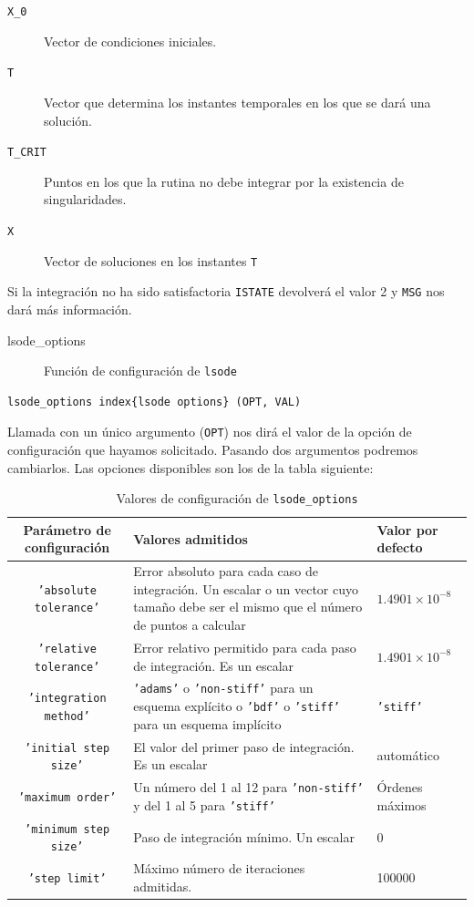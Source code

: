 \begin{description}
\item [\texttt{X\_0}]Vector de condiciones iniciales.
\item [\texttt{T}]Vector que determina los instantes temporales en los
  que se dará una solución.
\item [\texttt{T\_CRIT}]Puntos en los que la rutina no debe integrar
  por la existencia de singularidades.
\item [\texttt{X}]Vector de soluciones en los instantes \texttt{T}
\end{description}
Si la integración no ha sido satisfactoria \texttt{ISTATE} devolverá
el valor 2 y \texttt{MSG} nos dará más información.

\begin{description}
\item [lsode\_options]Función de configuración de \texttt{lsode}
\end{description}
\begin{verbatim}
lsode_options index{lsode options} (OPT, VAL)
\end{verbatim}
Llamada con un único argumento (\texttt{OPT}) nos dirá el valor de la
opción de configuración que hayamos solicitado. Pasando dos argumentos
podremos cambiarlos. Las opciones disponibles son los de la tabla
siguiente:

%
\begin{table}[H]
  \centering{}\begin{tabular}{|c|m{8cm}|p{3cm}|}
    \hline 
    Parámetro de configuración&
    Valores admitidos&
    Valor por defecto\tabularnewline
    \hline
    \hline 
    \texttt{'absolute tolerance'}&
    Error absoluto para cada caso de integración. Un escalar o un vector
    cuyo tamaño debe ser el mismo que el número de puntos a calcular&
    $1.4901\times10^{-8}$\tabularnewline
    \hline 
    \texttt{'relative tolerance'}&
    Error relativo permitido para cada paso de integración. Es un escalar&
    $1.4901\times10^{-8}$\tabularnewline
    \hline 
    \texttt{'integration method'}&
    \texttt{'adams'} o \texttt{'non-stiff'} para un esquema explícito
    o \texttt{'bdf'} o \texttt{'stiff'} para un esquema implícito&
    \texttt{'stiff'}\tabularnewline
    \hline 
    \texttt{'initial step size'}&
    El valor del primer paso de integración. Es un escalar&
    automático\tabularnewline
    \hline 
    \texttt{'maximum order'}&
    Un número del 1 al 12 para \texttt{'non-stiff'} y del 1 al 5 para
    \texttt{'stiff'}&
    Órdenes máximos\tabularnewline
    \hline 
    \texttt{'minimum step size'}&
    Paso de integración mínimo. Un escalar&
    0\tabularnewline
    \hline 
    \texttt{'step limit'}&
    Máximo número de iteraciones admitidas.&
    100000\tabularnewline
    \hline
  \end{tabular}


  \caption{Valores de configuración de \texttt{lsode\_options}}
\end{table}


